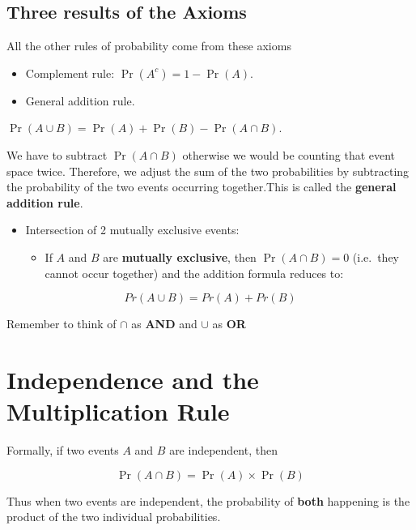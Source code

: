 \documentclass[
  oneside]{krantz}
\providecommand{\tightlist}{%
  \setlength{\itemsep}{0pt}\setlength{\parskip}{0pt}}
\begin{document}
\hypertarget{three-results-of-the-axioms}{%
\subsection{Three results of the Axioms}\label{three-results-of-the-axioms}}

All the other rules of probability come from these axioms

\begin{itemize}
\item
  Complement rule: \(\Pr(A^c) = 1 - \Pr(A)\).
\item
  General addition rule.
\end{itemize}

\(\Pr(A \cup B) = \Pr(A) + \Pr(B) - \Pr(A \cap B)\).

We have to subtract \(\Pr(A \cap B)\) otherwise we would be counting that event space twice. Therefore, we adjust the sum of the two probabilities by subtracting the probability of the two events occurring together.This is called the \textbf{general addition rule}.

\begin{itemize}
\item
  Intersection of 2 mutually exclusive events:

  \begin{itemize}
  \tightlist
  \item
    If \(A\) and \(B\) are \textbf{mutually exclusive}, then \(\Pr(A \cap B) = 0\) (i.e.~they cannot occur together) and the addition formula reduces to:
  \end{itemize}
\end{itemize}

\[Pr(A \cup B) = Pr(A) + Pr(B)\]

Remember to think of \(\cap\) as \textbf{AND} and \(\cup\) as \textbf{OR}

\hypertarget{independence-and-the-multiplication-rule}{%
\section{Independence and the Multiplication Rule}\label{independence-and-the-multiplication-rule}}

Formally, if two events \(A\) and \(B\) are independent, then

\[\Pr(A \cap B) = \Pr(A) \times \Pr(B)\]

Thus when two events are independent, the probability of \textbf{both} happening is the product of the two individual probabilities.
\end{document}
